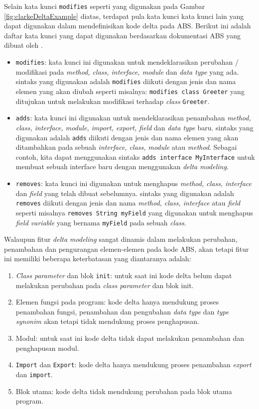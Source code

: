 Selain kata kunci \texttt{modifies} seperti yang digunakan pada Gambar \ref{fig:clarkeDeltaExample} diatas, terdapat pula kata kunci kata kunci lain yang dapat digunakan dalam mendefinisikan kode delta pada ABS. Berikut ini adalah daftar kata kunci yang dapat digunakan berdasarkan dokumentasi ABS yang dibuat oleh \cite{absref2013}.

\begin{itemize}
    \item \texttt{modifies}: kata kunci ini digunakan untuk mendeklarasikan perubahan / modifikasi pada \textit{method, class, interface, module} dan \textit{data type} yang ada. sintaks yang digunakan adalah \texttt{modifies} diikuti dengan jenis dan nama elemen yang akan diubah seperti misalnya: \texttt{modifies class Greeter} yang ditujukan untuk melakukan modifikasi terhadap \textit{class} \texttt{Greeter}.
    \item \texttt{adds}: kata kunci ini digunakan untuk mendeklarasikan penambahan \textit{method, class, interface, module, import, export, field} dan \textit{data type} baru. sintaks yang digunakan adalah \texttt{adds} diikuti dengan jenis dan nama elemen yang akan ditambahkan pada sebuah \textit{interface, class, module} atau \textit{method}. Sebagai contoh, kita dapat menggunakan sintaks \texttt{adds interface MyInterface} untuk membuat sebuah interface baru dengan menggunakan \textit{delta modeling}.
    \item \texttt{removes}: kata kunci ini digunakan untuk menghapus \textit{method, class, interface} dan \textit{field} yang telah dibuat sebelumnya. sintaks yang digunakan adalah \texttt{removes} diikuti dengan jenis dan nama \textit{method, class, interface} atau \textit{field} seperti misalnya \texttt{removes String myField} yang digunakan untuk menghapus \textit{field variable} yang bernama \texttt{myField} pada sebuah \textit{class}.
\end{itemize}

Walaupun fitur \textit{delta modeling} sangat dinamis dalam melakukan perubahan, penambahan dan pengurangan elemen-elemen pada kode ABS, akan tetapi fitur ini memiliki beberapa keterbatasan yang diantaranya adalah:

\begin{enumerate}
    \item \textit{Class parameter} dan blok \texttt{init}: untuk saat ini kode delta belum dapat melakukan perubahan pada \textit{class parameter} dan blok init.
    \item Elemen fungsi pada program: kode delta hanya mendukung proses penambahan fungsi, penambahan dan pengubahan \textit{data type} dan \textit{type synonim} akan tetapi tidak mendukung proses penghapusan.
    \item Modul: untuk saat ini kode delta tidak dapat melakukan penambahan dan penghapusan modul.
    \item \texttt{Import} dan \texttt{Export}: kode delta hanya mendukung proses penambahan \textit{export} dan \texttt{import}.
    \item Blok utama: kode delta tidak mendukung perubahan pada blok utama program.
\end{enumerate}